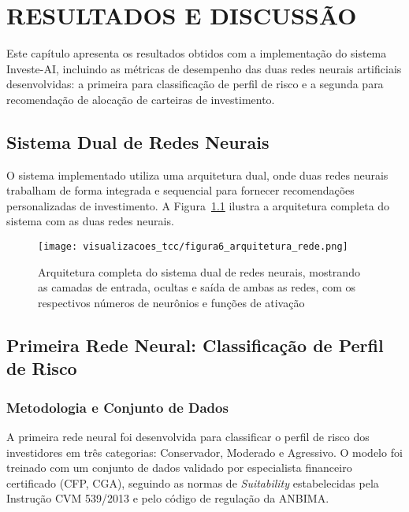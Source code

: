 
\chapter{RESULTADOS E DISCUSSÃO}

Este capítulo apresenta os resultados obtidos com a implementação do sistema Investe-AI, incluindo as métricas de desempenho das duas redes neurais artificiais desenvolvidas: a primeira para classificação de perfil de risco e a segunda para recomendação de alocação de carteiras de investimento.

\section{Sistema Dual de Redes Neurais}

O sistema implementado utiliza uma arquitetura dual, onde duas redes neurais trabalham de forma integrada e sequencial para fornecer recomendações personalizadas de investimento. A Figura~\ref{fig:arquitetura_rede} ilustra a arquitetura completa do sistema com as duas redes neurais.

\begin{figure}[htbp]
    \centering
    \texttt{[image: visualizacoes\_tcc/figura6\_arquitetura\_rede.png]}
    \caption{Arquitetura completa do sistema dual de redes neurais, mostrando as camadas de entrada, ocultas e saída de ambas as redes, com os respectivos números de neurônios e funções de ativação}
    \label{fig:arquitetura_rede}
\end{figure}

\section{Primeira Rede Neural: Classificação de Perfil de Risco}

\subsection{Metodologia e Conjunto de Dados}

A primeira rede neural foi desenvolvida para classificar o perfil de risco dos investidores em três categorias: Conservador, Moderado e Agressivo. O modelo foi treinado com um conjunto de dados validado por especialista financeiro certificado (CFP\textregistered, CGA), seguindo as normas de \textit{Suitability} estabelecidas pela Instrução CVM 539/2013 e pelo código de regulação da ANBIMA.

